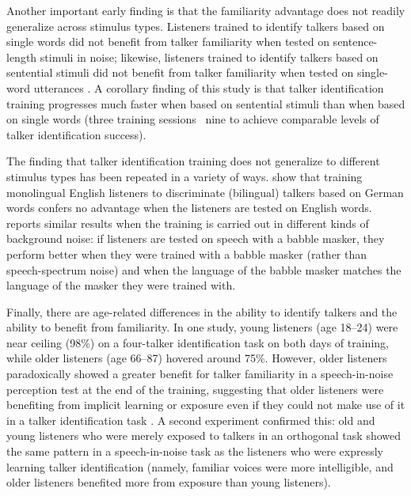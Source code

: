 Another important early finding is that the familiarity advantage does not readily generalize across stimulus types.  Listeners trained to identify talkers based on single words did not benefit from talker familiarity when tested on sentence-length stimuli in noise; likewise, listeners trained to identify talkers based on sentential stimuli did not benefit from talker familiarity when tested on single-word utterances \citep{NygaardPisoni1998, YonanSommers2000}.  A corollary finding of this study is that talker identification training progresses much faster when based on sentential stimuli than when based on single words (three training sessions \vs\ nine to achieve comparable levels of talker identification success).     

The finding that talker identification training does not generalize to different stimulus types has been repeated in a variety of ways.  \citet{LeviEtAl2011} show that training monolingual English listeners to discriminate (bilingual) talkers based on German words confers no advantage when the listeners are tested on English words.\footnotemark{}  \citet{VanEngen2012} reports similar results when the training is carried out in different kinds of background noise: if listeners are tested on speech with a babble masker, they perform better when they were trained with a babble masker (rather than speech-spectrum noise) and when the language of the babble masker matches the language of the masker they were trained with.



Finally, there are age-related differences in the ability to identify talkers and the ability to benefit from familiarity.  In one study, young listeners (age 18–24) were near ceiling (98\%) on a four-talker identification task on both days of training, while older listeners (age 66–87) hovered around 75\%.  However, older listeners paradoxically showed a greater benefit for talker familiarity in a speech-in-noise perception test at the end of the training, suggesting that older listeners were benefiting from implicit learning or exposure even if they could not make use of it in a talker identification task \citep{YonanSommers2000}.  A second experiment confirmed this: old and young listeners who were merely exposed to talkers in an orthogonal task showed the same pattern in a speech-in-noise task as the listeners who were expressly learning talker identification (namely, familiar voices were more intelligible, and older listeners benefited more from exposure than young listeners).

